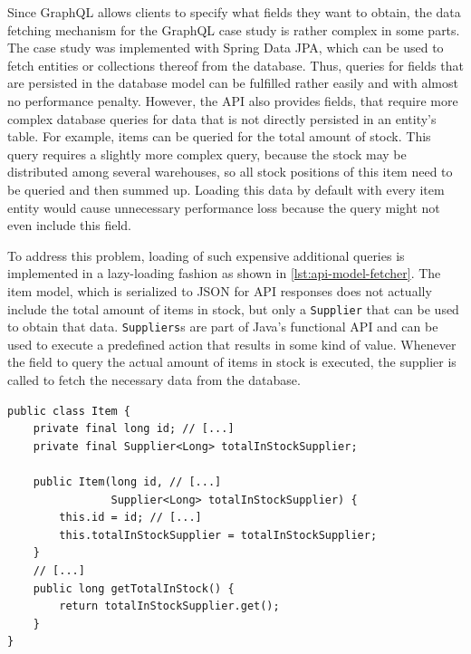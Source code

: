 Since GraphQL allows clients to specify what fields they want to obtain, the data fetching mechanism for the GraphQL case study is rather complex in some parts.
The case study was implemented with Spring Data \ac{JPA}, which can be used to fetch entities or collections thereof from the database.
Thus, queries for fields that are persisted in the database model can be fulfilled rather easily and with almost no performance penalty.
However, the \ac{API} also provides fields, that require more complex database queries for data that is not directly persisted in an entity's table.
For example, items can be queried for the total amount of stock.
This query requires a slightly more complex query, because the stock may be distributed among several warehouses, so all stock positions of this item need to be queried and then summed up.
Loading this data by default with every item entity would cause unnecessary performance loss because the query might not even include this field.

To address this problem, loading of such expensive additional queries is implemented in a lazy-loading fashion as shown in \autoref{lst:api-model-fetcher}.
The item model, which is serialized to \ac{JSON} for \ac{API} responses does not actually include the total amount of items in stock, but only a \texttt{Supplier} that can be used to obtain that data.
\texttt{Suppliers}s are part of Java's functional \ac{API} and can be used to execute a predefined action that results in some kind of value.
Whenever the field to query the actual amount of items in stock is executed, the supplier is called to fetch the necessary data from the database.

\begin{lstlisting}[caption={Data Fetching in \acs{API} Models}, style=java-ext, label={lst:api-model-fetcher}]
public class Item {
    private final long id; // [...]
    private final Supplier<Long> totalInStockSupplier;

    public Item(long id, // [...]
                Supplier<Long> totalInStockSupplier) {
        this.id = id; // [...]
        this.totalInStockSupplier = totalInStockSupplier;
    }
    // [...]
    public long getTotalInStock() {
        return totalInStockSupplier.get();
    }
}
\end{lstlisting}

